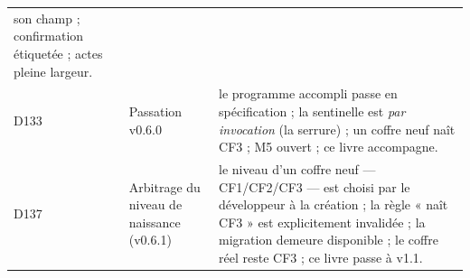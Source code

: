 \begin{longtable}{@{}p{1.5cm} p{4.6cm} >{\raggedright\arraybackslash}p{9.4cm}@{}}
son champ ; confirmation étiquetée ; actes pleine largeur. \\
D133 & Passation v0.6.0 & le programme accompli passe en spécification ; la sentinelle
est \emph{par invocation} (la serrure) ; un coffre neuf naît CF3 ; M5 ouvert ; ce
livre accompagne. \\
D137 & Arbitrage du niveau de naissance (v0.6.1) & le niveau d'un coffre neuf —
CF1/CF2/CF3 — est choisi par le développeur à la création ; la règle « naît CF3 » est
explicitement invalidée ; la migration demeure disponible ; le coffre réel reste CF3 ;
ce livre passe à v1.1. \\
\end{longtable}
